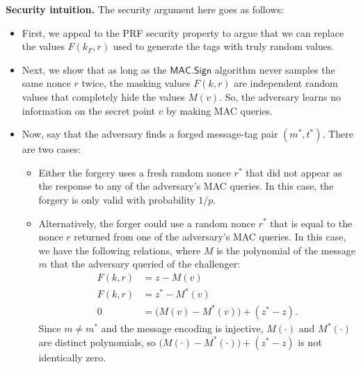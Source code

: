 \documentclass[
  letterpaper,
]{scrbook}
\newcommand{\MACSign}{\mathsf{MAC.Sign}}
\theoremstyle{definition}
\theoremstyle{plain}
\theoremstyle{plain}
\theoremstyle{remark}
\begin{document}
\textbf{Security intuition.} The security argument here goes as follows:


\begin{itemize}
\item
  First, we appeal to the PRF security property to argue that we can
  replace the values \(F(k_F, r)\) used to generate the tags with truly
  random values.
\item
  Next, we show that as long as the \(\MACSign\) algorithm never samples
  the same nonce \(r\) twice, the masking values \(F(k,r)\) are
  independent random values that completely hide the values \(M(v)\).
  So, the adversary learns no information on the secret point \(v\) by
  making MAC queries.
\item
  Now, say that the adversary finds a forged message-tag pair
  \((m^*, t^*)\). There are two cases:

  \begin{itemize}
  \item
    Either the forgery uses a fresh random nonce \(r^*\) that did not
    appear as the response to any of the adversary's MAC queries. In
    this case, the forgery is only valid with probability \(1/p\).
  \item
    Alternatively, the forger could use a random nonce \(r^*\) that is
    equal to the nonce \(r\) returned from one of the adversary's MAC
    queries. In this case, we have the following relations, where \(M\)
    is the polynomial of the message \(m\) that the adversary queried of
    the challenger: \[\begin{aligned}
      F(k, r) &= z - M(v)\\
      F(k, r) &= z^* - M^*(v)\\
      0 &= \big(M(v) - M^*(v)\big) + (z^* - z).
    \end{aligned}\] Since \(m \neq m^*\) and the message encoding is
    injective, \(M(\cdot)\) and \(M^*(\cdot)\) are distinct polynomials,
    so \(\big(M(\cdot) - M^*(\cdot)\big) + (z^* - z)\) is not
    identically zero.

    \marginnote{\begin{footnotesize}


\end{footnotesize}}
\end{itemize}
\end{itemize}
\end{document}
